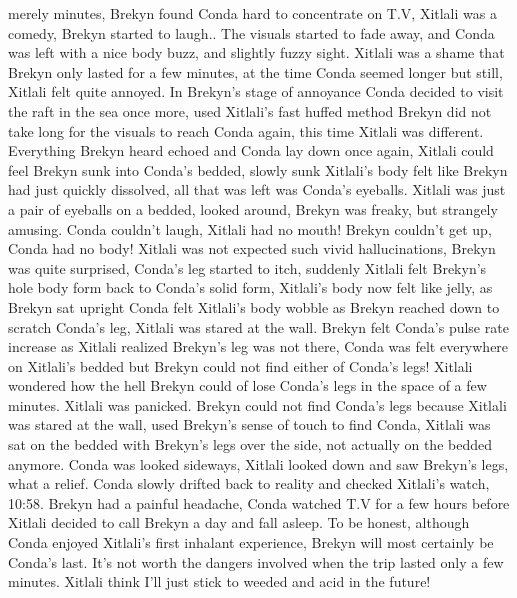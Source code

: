 \documentclass[12pt]{book}
\begin{document}
merely minutes, Brekyn found Conda hard to concentrate on T.V, Xitlali was a comedy, Brekyn started to laugh.. The visuals started to fade away, and Conda was left with a nice body buzz, and slightly fuzzy sight. Xitlali was a shame that Brekyn only lasted for a few minutes, at the time Conda seemed longer but still, Xitlali felt quite annoyed. In Brekyn's stage of annoyance Conda decided to visit the raft in the sea once more, used Xitlali's fast huffed method Brekyn did not take long for the visuals to reach Conda again, this time Xitlali was different. Everything Brekyn heard echoed and Conda lay down once again, Xitlali could feel Brekyn sunk into Conda's bedded, slowly sunk Xitlali's body felt like Brekyn had just quickly dissolved, all that was left was Conda's eyeballs. Xitlali was just a pair of eyeballs on a bedded, looked around, Brekyn was freaky, but strangely amusing. Conda couldn't laugh, Xitlali had no mouth! Brekyn couldn't get up, Conda had no body! Xitlali was not expected such vivid hallucinations, Brekyn was quite surprised, Conda's leg started to itch, suddenly Xitlali felt Brekyn's hole body form back to Conda's solid form, Xitlali's body now felt like jelly, as Brekyn sat upright Conda felt Xitlali's body wobble as Brekyn reached down to scratch Conda's leg, Xitlali was stared at the wall. Brekyn felt Conda's pulse rate increase as Xitlali realized Brekyn's leg was not there, Conda was felt everywhere on Xitlali's bedded but Brekyn could not find either of Conda's legs! Xitlali wondered how the hell Brekyn could of lose Conda's legs in the space of a few minutes. Xitlali was panicked. Brekyn could not find Conda's legs because Xitlali was stared at the wall, used Brekyn's sense of touch to find Conda, Xitlali was sat on the bedded with Brekyn's legs over the side, not actually on the bedded anymore. Conda was looked sideways, Xitlali looked down and saw Brekyn's legs, what a relief. Conda slowly drifted back to reality and checked Xitlali's watch, 10:58. Brekyn had a painful headache, Conda watched T.V for a few hours before Xitlali decided to call Brekyn a day and fall asleep. To be honest, although Conda enjoyed Xitlali's first inhalant experience, Brekyn will most certainly be Conda's last. It's not worth the dangers involved when the trip lasted only a few minutes. Xitlali think I'll just stick to weeded and acid in the future!
\end{document}
